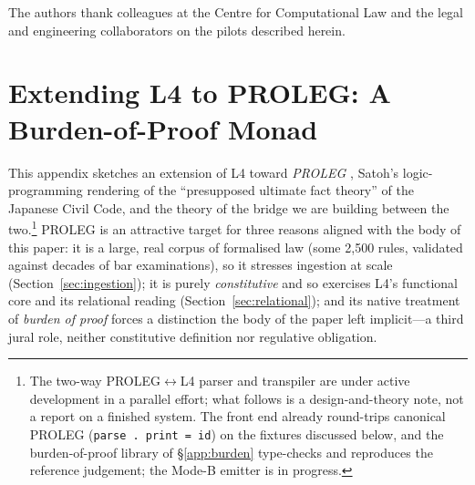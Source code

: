 \documentclass[sigconf,nonacm]{acmart}
\newcommand{\code}[1]{\texttt{\small #1}}
\begin{document}
\begin{acks}
The authors thank colleagues at the Centre for Computational Law and the
legal and engineering collaborators on the pilots described herein.
\end{acks}

\appendix
\section{Extending L4 to PROLEG: A Burden-of-Proof Monad}\label{app:proleg}

This appendix sketches an extension of L4 toward \emph{PROLEG}
\cite{satoh2011proleg}, Satoh's logic-programming rendering of the
``presupposed ultimate fact theory'' of the Japanese Civil Code, and the
theory of the bridge we are building between the two.\footnote{The two-way
PROLEG$\leftrightarrow$L4 parser and transpiler are under active development
in a parallel effort; what follows is a design-and-theory note, not a report
on a finished system. The front end already round-trips canonical PROLEG
(\code{parse . print = id}) on the fixtures discussed below, and the
burden-of-proof library of \S\ref{app:burden} type-checks and reproduces the
reference judgement; the Mode-B emitter is in progress.} PROLEG is an
attractive target for three reasons aligned with the body of this paper: it
is a large, real corpus of formalised law (some 2{,}500 rules, validated
against decades of bar examinations), so it stresses ingestion at scale
(Section~\ref{sec:ingestion}); it is purely \emph{constitutive} and so
exercises L4's functional core and its relational reading
(Section~\ref{sec:relational}); and its native treatment of \emph{burden of
proof} forces a distinction the body of the paper left implicit---a third
jural role, neither constitutive definition nor regulative obligation.
\end{document}
